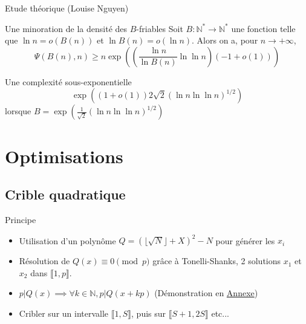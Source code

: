 \documentclass{beamer}
\begin{document}
\begin{frame}{Etude théorique (Louise Nguyen)}
    \begin{block}{Une minoration de la densité des $B$-friables}
    Soit $B : \mathbb N^\ast \to \mathbb N^\ast$ une fonction telle que $\ln n = o(B(n))$ et $\ln B(n) = o (\ln n)$. Alors on a, pour $n \to +\infty$,
    \[
    \Psi(B(n), n) \ge n\exp\left(\left(\frac {\ln n}{\ln B(n)} \ln \ln n\right)(-1 + o(1))\right)
    \]
    \end{block}
    \begin{block}{Une complexité sous-exponentielle}
    \[
    \exp\left((1+ o(1))2{\sqrt 2} (\ln n \ln \ln n)^{1/2}\right)
    \]
    lorsque $B =\exp\left(\frac 1{\sqrt 2}(\ln n\ln \ln n)^{1/2}\right)$
    \end{block}
\end{frame}

\section{Optimisations}
\subsection{Crible quadratique}

\begin{frame}{Principe}
    \begin{itemize}[<+->]
        \item Utilisation d'un polynôme $Q = (\lfloor\sqrt N\rfloor + X)^2 - N$ pour générer les $x_i$
        \item Résolution de $Q(x) \equiv 0 \pmod p$ grâce à Tonelli-Shanks, 2 solutions $x_1$ et $x_2$ dans $\llbracket 1, p \rrbracket$.
        \item $p|Q(x) \implies \forall k\in \mathbb N,  p|Q(x+kp)$ (Démonstration en \hyperref[demo:qx]{Annexe})
        \item Cribler sur un intervalle $\llbracket 1,S \rrbracket$, puis sur $\llbracket S+1,2S \rrbracket$ etc...
    \end{itemize}
\end{frame}


\end{document}
